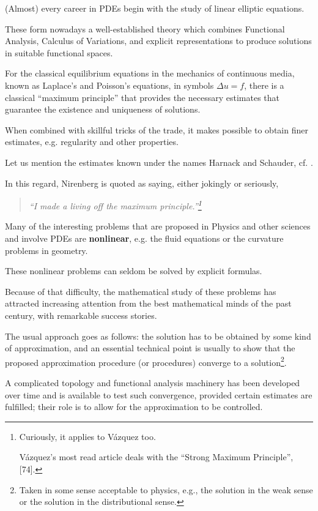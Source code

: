 \documentclass{article}
\begin{document}
(Almost) every career in PDEs begin with the study of linear elliptic equations.

These form nowadays a well-established theory which combines Functional Analysis, Calculus of Variations, and explicit representations to produce solutions in suitable functional spaces.

For the classical equilibrium equations in the mechanics of continuous media, known as Laplace's and Poisson's equations, in symbols $\Delta u = f$, there is a classical ``maximum principle'' that provides the necessary estimates that guarantee the existence and uniqueness of solutions.

When combined with skillful tricks of the trade, it makes possible to obtain finer estimates, e.g. regularity and other properties.

Let us mention the estimates known under the names Harnack and Schauder, cf. \cite{Evans2010, Gilbarg_Trudinger2001}.

In this regard, Nirenberg is quoted as saying, either jokingly or seriously,
\begin{quotation}\it
	``I made a living off the maximum principle.''\footnote{Curiously, it applies to V\'azquez too.
		
		V\'azquez's most read article deals with the ``Strong Maximum Principle'', [74].}
\end{quotation}
Many of the interesting problems that are proposed in Physics and other sciences and involve PDEs are \textbf{nonlinear}, e.g. the fluid equations or the curvature problems in geometry.

These nonlinear problems can seldom be solved by explicit formulas.

Because of that difficulty, the mathematical study of these problems has attracted increasing attention from the best mathematical minds of the past century, with remarkable success stories.

The usual approach goes as follows: the solution has to be obtained by some kind of approximation, and an essential technical point is usually to show that the proposed approximation procedure (or procedures) converge to a solution\footnote{Taken in some sense acceptable to physics, e.g., the solution in the weak sense or the solution in the distributional sense.}.

A complicated topology and functional analysis machinery has been developed over time and is available to test such convergence, provided certain estimates are fulfilled; their role is to allow for the approximation to be controlled.
\end{document}
